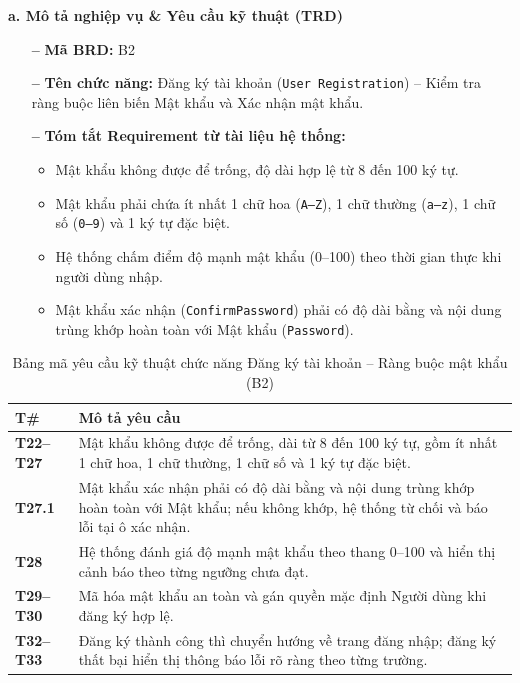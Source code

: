 \documentclass[11pt,a4paper]{article}
\begin{document}
\noindent\textbf{a. Mô tả nghiệp vụ \& Yêu cầu kỹ thuật (TRD)}
\begin{itemize}[leftmargin=1.2cm, noitemsep]
    \item[\textbf{--}] \textbf{Mã BRD:} B2
    \item[\textbf{--}] \textbf{Tên chức năng:} Đăng ký tài khoản (\texttt{User Registration}) -- Kiểm tra ràng buộc liên biến Mật khẩu và Xác nhận mật khẩu.
    \item[\textbf{--}] \textbf{Tóm tắt Requirement từ tài liệu hệ thống:}
    \begin{itemize}[leftmargin=0.8cm, label=$\bullet$, noitemsep]
        \item Mật khẩu không được để trống, độ dài hợp lệ từ 8 đến 100 ký tự.
        \item Mật khẩu phải chứa ít nhất 1 chữ hoa (\texttt{A--Z}), 1 chữ thường (\texttt{a--z}), 1 chữ số (\texttt{0--9}) và 1 ký tự đặc biệt.
        \item Hệ thống chấm điểm độ mạnh mật khẩu (0--100) theo thời gian thực khi người dùng nhập.
        \item Mật khẩu xác nhận (\texttt{ConfirmPassword}) phải có độ dài bằng và nội dung trùng khớp hoàn toàn với Mật khẩu (\texttt{Password}).
    \end{itemize}
\end{itemize}

\begin{table}[H]
\centering
\small
\begin{tabularx}{\textwidth}{|C{1.8cm}|X|}
\hline
{}
\textbf{T\#} & \textbf{Mô tả yêu cầu} \tabularnewline
\hline
\textbf{T22--T27} & Mật khẩu không được để trống, dài từ 8 đến 100 ký tự, gồm ít nhất 1 chữ hoa, 1 chữ thường, 1 chữ số và 1 ký tự đặc biệt. \\ \hline
\textbf{T27.1} & Mật khẩu xác nhận phải có độ dài bằng và nội dung trùng khớp hoàn toàn với Mật khẩu; nếu không khớp, hệ thống từ chối và báo lỗi tại ô xác nhận. \\ \hline
\textbf{T28} & Hệ thống đánh giá độ mạnh mật khẩu theo thang 0--100 và hiển thị cảnh báo theo từng ngưỡng chưa đạt. \\ \hline
\textbf{T29--T30} & Mã hóa mật khẩu an toàn và gán quyền mặc định Người dùng khi đăng ký hợp lệ. \\ \hline
\textbf{T32--T33} & Đăng ký thành công thì chuyển hướng về trang đăng nhập; đăng ký thất bại hiển thị thông báo lỗi rõ ràng theo từng trường. \\ \hline
\end{tabularx}
\caption{Bảng mã yêu cầu kỹ thuật chức năng Đăng ký tài khoản -- Ràng buộc mật khẩu (B2)}
\end{table}
\end{document}
